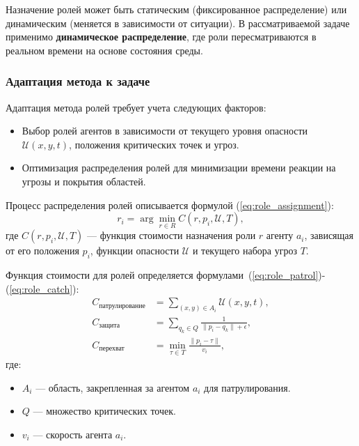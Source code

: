 Назначение ролей может быть статическим (фиксированное распределение) или динамическим (меняется в зависимости от ситуации).
В рассматриваемой задаче применимо \textbf{динамическое распределение}, где роли пересматриваются в реальном времени на основе состояния среды.

\subsubsection*{Адаптация метода к задаче}
Адаптация метода ролей требует учета следующих факторов:
\begin{itemize}
	\item Выбор ролей агентов в зависимости от текущего уровня опасности $\mathcal{U}(x, y, t)$, положения критических точек и угроз.
	\item Оптимизация распределения ролей для минимизации времени реакции на угрозы и покрытия областей.
\end{itemize}

Процесс распределения ролей описывается формулой (\ref{eq:role_assignment}):
\begin{equation}
	r_i = \arg \min_{r \in R} C(r, p_i, \mathcal{U}, T),
	\label{eq:role_assignment}
\end{equation}
где $C(r, p_i, \mathcal{U}, T)$ — функция стоимости назначения роли $r$ агенту $a_i$, зависящая от его положения $p_i$, функции опасности $\mathcal{U}$ и текущего набора угроз $T$.

Функция стоимости для ролей определяется формулами~(\ref{eq:role_patrol})-(\ref{eq:role_catch}):
\begin{align}
	C_{\text{патрулирование}} &= \sum_{(x, y) \in A_i} \mathcal{U}(x, y, t), \label{eq:role_patrol} \\
	C_{\text{защита}} &= \sum_{q_k \in Q} \frac{1}{\|p_i - q_k\| + \epsilon}, \label{eq:role_defend} \\
	C_{\text{перехват}} &= \min_{\tau \in T} \frac{\|p_i - \tau\|}{v_i}, \label{eq:role_catch}
\end{align}
где:
\begin{itemize}[leftmargin=1.6\parindent]
	\item $A_i$ — область, закрепленная за агентом $a_i$ для патрулирования.
	\item $Q$ — множество критических точек.
	\item $v_i$ — скорость агента $a_i$.
\end{itemize}

